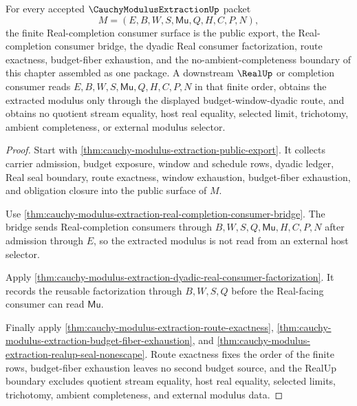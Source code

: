 \begin{theorem}
\label{thm:cauchy-modulus-extraction-mature-package-summary}
For every accepted $\CauchyModulusExtractionUp$ packet
$$
M=(E,B,W,S,\mathsf{Mu},Q,H,C,P,N),
$$
the finite Real-completion consumer surface is the public export, the Real-completion consumer bridge, the dyadic Real consumer factorization, route exactness, budget-fiber exhaustion, and the no-ambient-completeness boundary of this chapter assembled as one package. A downstream $\RealUp$ or completion consumer reads $E,B,W,S,\mathsf{Mu},Q,H,C,P,N$ in that finite order, obtains the extracted modulus only through the displayed budget-window-dyadic route, and obtains no quotient stream equality, host real equality, selected limit, trichotomy, ambient completeness, or external modulus selector.
\end{theorem}
\begin{proof}
Start with \autoref{thm:cauchy-modulus-extraction-public-export}. It collects carrier admission, budget exposure, window and schedule rows, dyadic ledger, Real seal boundary, route exactness, window exhaustion, budget-fiber exhaustion, and obligation closure into the public surface of $M$.

Use \autoref{thm:cauchy-modulus-extraction-real-completion-consumer-bridge}. The bridge sends Real-completion consumers through $B,W,S,Q,\mathsf{Mu},H,C,P,N$ after admission through $E$, so the extracted modulus is not read from an external host selector.

Apply \autoref{thm:cauchy-modulus-extraction-dyadic-real-consumer-factorization}. It records the reusable factorization through $B,W,S,Q$ before the Real-facing consumer can read $\mathsf{Mu}$.

Finally apply \autoref{thm:cauchy-modulus-extraction-route-exactness}, \autoref{thm:cauchy-modulus-extraction-budget-fiber-exhaustion}, and \autoref{thm:cauchy-modulus-extraction-realup-seal-nonescape}. Route exactness fixes the order of the finite rows, budget-fiber exhaustion leaves no second budget source, and the RealUp boundary excludes quotient stream equality, host real equality, selected limits, trichotomy, ambient completeness, and external modulus data.
\end{proof}


